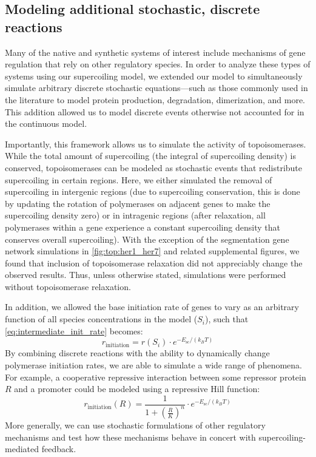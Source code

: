 \documentclass[11pt]{article}
\begin{document}
\subsection{Modeling additional stochastic, discrete reactions}
Many of the native and synthetic systems of interest include mechanisms of gene regulation that rely on other regulatory species. In order to analyze these types of systems using our supercoiling model, we extended our model to simultaneously simulate arbitrary discrete stochastic equations---such as those commonly used in the literature to model protein production, degradation, dimerization, and more. This addition allowed us to model discrete events otherwise not accounted for in the continuous model.

Importantly, this framework allows us to simulate the activity of topoisomerases. While the total amount of supercoiling (the integral of supercoiling density) is conserved, topoisomerases can be modeled as stochastic events that redistribute supercoiling in certain regions. Here, we either simulated the removal of supercoiling in intergenic regions (due to supercoiling conservation, this is done by updating the rotation of polymerases on adjacent genes to make the supercoiling density zero) or in intragenic regions (after relaxation, all polymerases within a gene experience a constant supercoiling density that conserves overall supercoiling). With the exception of the segmentation gene network simulations in \cref{fig:top:her1_her7} and related supplemental figures, we found that inclusion of topoisomerase relaxation did not appreciably change the observed results. Thus, unless otherwise stated, simulations were performed without topoisomerase relaxation.

In addition, we allowed the base initiation rate of genes to vary as an arbitrary function of all species concentrations in the model (\(S_i\)), such that \cref{eq:intermediate_init_rate} becomes:
\begin{equation}
    r_\text{initiation} = r(S_i) \cdot e^{- E_\text{sc} / (k_B T)}
\label{eq:final_init_rate}
\end{equation}
By combining discrete reactions with the ability to dynamically change polymerase initiation rates, we are able to simulate a wide range of phenomena.
For example, a cooperative repressive interaction between some repressor protein \(R\) and a promoter could be modeled using a repressive Hill function:
\begin{equation*}
    r_\text{initiation}(R) = \frac{1}{1 + \left(\frac{R}{K}\right)^n} \cdot e^{-E_\text{sc} / (k_B T)}
\end{equation*}
More generally, we can use stochastic formulations of other regulatory mechanisms and test how these mechanisms behave in concert with supercoiling-mediated feedback.
\end{document}
